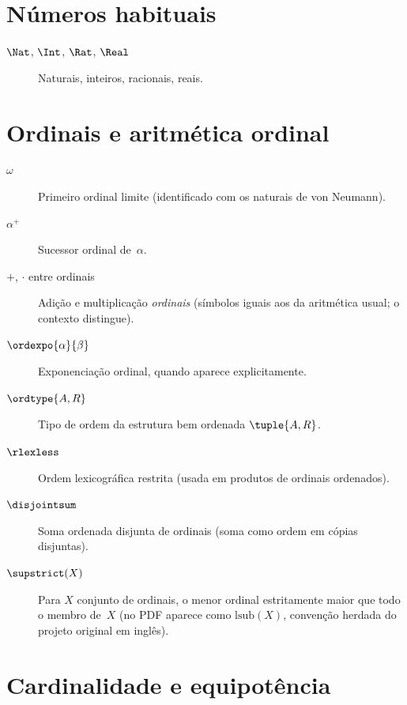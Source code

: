 \section*{Números habituais}

\begin{description}
\item[$\Nat$, $\Int$, $\Rat$, $\Real$] Naturais, inteiros, racionais, reais.
\end{description}

\section*{Ordinais e aritmética ordinal}

\begin{description}
\item[$\omega$] Primeiro ordinal limite (identificado com os naturais de von Neumann).
\item[$\alpha^{+}$] Sucessor ordinal de~$\alpha$.
\item[$+$, $\cdot$ entre ordinais] Adição e multiplicação \emph{ordinais} (símbolos iguais aos da aritmética usual; o contexto distingue).
\item[$\ordexpo{\alpha}{\beta}$] Exponenciação ordinal, quando aparece explicitamente.
\item[$\ordtype{A,R}$] Tipo de ordem da estrutura bem ordenada $\tuple{A,R}$.
\item[$\rlexless$] Ordem lexicográfica restrita (usada em produtos de ordinais ordenados).
\item[$\disjointsum$] Soma ordenada disjunta de ordinais (soma como ordem em cópias disjuntas).
\item[$\supstrict(X)$] Para $X$ conjunto de ordinais, o menor ordinal estritamente maior que todo o membro de~$X$ (no PDF aparece como $\mathrm{lsub}(X)$, convenção herdada do projeto original em inglês).
\end{description}

\section*{Cardinalidade e equipotência}

